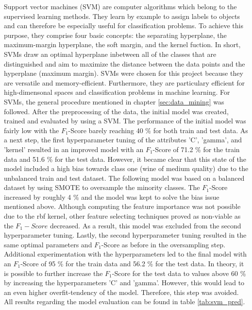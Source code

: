 Support vector machines (SVM) are computer algorithms which belong to the supervised learning methods. They learn by example to assign labels to objects and can therefore be especially useful for classification problems. To achieve this purpose, they comprise four basic concepts: the separating hyperplane, the maximum-margin hyperplane, the soft margin, and the kernel fuction. In short, SVMs draw an optimal hyperplane inbetween all of the classes that are distinguished and aim to maximize the distance between the data points and the hyperplane (maximum margin). \citep{Noble2006}
SVMs were chosen for this project because they are versatile and memory-efficient. Furthermore, they are particulary efficient for high-dimensonal spaces and classification problems in machine learning. \citep{ScikitLearn2021}
For SVMs, the general procedure mentioned in chapter \ref{sec:data_mining} was followed. After the preprocessing of the data, the initial model was created, trained and evaluated by using a SVM. The performance of the initial model was fairly low with the $F_1$-Score barely reaching 40 \% for both train and test data. As a next step, the first hyperparameter tuning of the attributes 'C', 'gamma', and 'kernel' resulted in an improved model with an $F_1$-Score of 71.2 \% for the train data and 51.6 \% for the test data. However, it became clear that this state of the model included a high bias towards class one (wine of medium quality) due to the unbalanced train and test dataset. 
The following model was based on a balanced dataset by using SMOTE to oversample the minority classes. The $F_1$-Score increased by roughly 4 \% and the model was kept to solve the bias issue mentioned above. Although computing the feature importance was not possible due to the rbf kernel, other feature selecting techniques proved as non-viable as the $F_1-Score$ decreased. As a result, this model was excluded from the second hyperparameter tuning. 
Lastly, the second hyperparameter tuning resulted in the same optimal parameters and $F_1$-Score as before in the oversampling step. Additional experimentation with the hyperparameters led to the final model with an $F_1$-Score of 95 \% for the train data and 56.2 \% for the test data. In theory, it is possible to further increase the $F_1$-Score for the test data to values above 60 \% by increasing the hyperparameters 'C' and 'gamma'. However, this would lead to an even higher overfit-tendency of the model. Therefore, this step was avoided. All results regarding the model evaluation can be found in table \ref{tab:svm_pred}.


